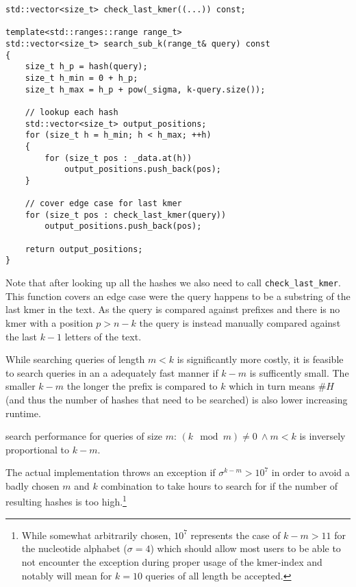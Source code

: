 \begin{minipage}{\linewidth} %
\begin{lstlisting}[caption={Search function for queries of size 0 < m < k.},language={[GNU]C++},tabsize=2]
std::vector<size_t> check_last_kmer((...)) const;

template<std::ranges::range range_t>
std::vector<size_t> search_sub_k(range_t& query) const
{
	size_t h_p = hash(query);
	size_t h_min = 0 + h_p;
	size_t h_max = h_p + pow(_sigma, k-query.size());

	// lookup each hash
	std::vector<size_t> output_positions;
	for (size_t h = h_min; h < h_max; ++h)
	{
		for (size_t pos : _data.at(h))
			output_positions.push_back(pos);
	}

	// cover edge case for last kmer
	for (size_t pos : check_last_kmer(query))
		output_positions.push_back(pos);

	return output_positions;
}
\end{lstlisting}
\end{minipage}

Note that after looking up all the hashes we also need to call \lstinline{check_last_kmer}. This function covers an
edge case were the query happens to be a substring of the last kmer in the text. As the query is compared
against prefixes and there is no kmer with a position $p>n-k$ the query is instead
manually compared against the last $k-1$ letters of the text.

While searching queries of length $m<k$ is significantly more costly, it is feasible to search queries in an a
adequately fast manner if $k-m$ is sufficently small. The smaller $k-m$ the longer the prefix is compared to $k$ which
in turn means $\#H$ (and thus the number of hashes that need to be searched) is also lower increasing runtime.

\begin{lem}
\label{Lemma 2}
search performance for queries of size $m:\,(k\mod m)\neq0\:\land m<k$ is inversely proportional to $k-m$.
\end{lem}

The actual implementation throws an exception if $\sigma^{k-m}>10^{7}$ in order to avoid a badly chosen $m$ and $k$
combination to take hours to search for if the number of resulting hashes is too high.\footnote{While somewhat arbitrarily
chosen, $10^{7}$ represents the case of $k-m>11$ for the nucleotide alphabet ($\sigma=4$) which should allow most users
to be able to not encounter the exception during proper usage of the kmer-index and notably will mean for $k=10$ queries
of all length be accepted.}

